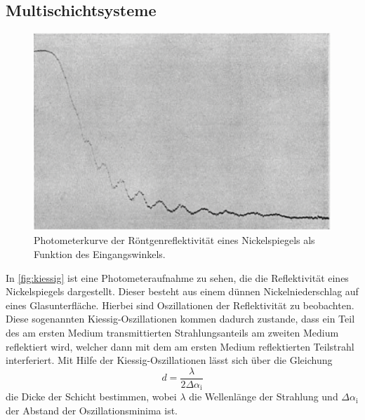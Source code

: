 \subsection{Multischichtsysteme}
\begin{figure}[tb]
  \centering
  \includegraphics[width=12cm,keepaspectratio]{kiessing_oszillationen.png}
  \caption{Photometerkurve der Röntgenreflektivität eines Nickelspiegels als Funktion des Eingangswinkels.\cite{kiessig}}
  \label{fig:kiessig}
\end{figure}
In \autoref{fig:kiessig} ist eine Photometeraufnahme zu sehen, die die Reflektivität eines Nickelspiegels dargestellt. Dieser besteht aus einem dünnen Nickelniederschlag auf eines Glasunterfläche. Hierbei sind Oszillationen der Reflektivität zu beobachten. Diese sogenannten Kiessig-Oszillationen kommen dadurch zustande, dass ein Teil des am ersten Medium transmittierten Strahlungsanteils am zweiten Medium reflektiert wird, welcher dann mit dem am ersten Medium reflektierten Teilstrahl interferiert. Mit Hilfe der Kiessig-Oszillationen lässt sich über die Gleichung
\begin{equation}
  d = \frac{\lambda}{2 \Delta \alpha_\mathrm{i}}
  \label{eqn:abstandoderso}
\end{equation}
die Dicke der Schicht bestimmen, wobei $\lambda$ die Wellenlänge der Strahlung und $\Delta \alpha_\mathrm{i}$ der Abstand der Oszillationsminima ist.

